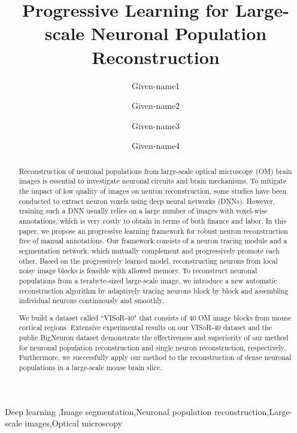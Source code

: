 \documentclass[times,twocolumn,final]{elsarticle}
\begin{document}
	

\begin{frontmatter}

\title{Progressive Learning for Large-scale Neuronal Population Reconstruction}                      

\author[1]{Given-name1 }
\author[1]{Given-name2 }
\author[2]{Given-name3 }
\author[2]{Given-name4 }

\address[1]{Affiliation 1, Address, City and Postal Code, Country}
\address[2]{Affiliation 2, Address, City and Postal Code, Country}


\begin{abstract}
Reconstruction of neuronal populations from large-scale optical microscopy (OM) brain images is essential to investigate neuronal circuits and brain mechanisms.
To mitigate the impact of low quality of images on neuron reconstruction, some studies have been conducted to extract neuron voxels using deep neural networks (DNNs).
However, training such a DNN usually relies on a large number of images with voxel-wise annotations, which is very costly to obtain in terms of both finance and labor.
In this paper, we propose an progressive learning framework for robust neuron reconstruction free of manual annotations. Our framework consists of a neuron tracing module and a segmentation network, which mutually complement and progressively promote each other.
Based on the progressively learned model, reconstructing neurons from local noisy image blocks is feasible with allowed memory.
To reconstruct neuronal populations from a terabyte-sized large-scale image, we introduce a new automatic reconstruction algorithm by adaptively tracing neurons block by block and assembling individual neurons continuously and smoothly.

We build a dataset called ``VISoR-40" that consists of 40 OM image blocks from mouse cortical regions. Extensive experimental results on our VISoR-40 dataset and the public BigNeuron dataset demonstrate the effectiveness and superiority of our method for neuronal population reconstruction and single neuron reconstruction, respectively.
Furthermore, we successfully apply our method to the reconstruction of dense neuronal populations in a large-scale mouse brain slice.
\end{abstract}

\begin{keyword}
\KWD Deep learning \sep Image segmentation\sep Neuronal population reconstruction\sep Large-scale images\sep Optical microscopy
\end{keyword}

\end{frontmatter}
\end{document}
